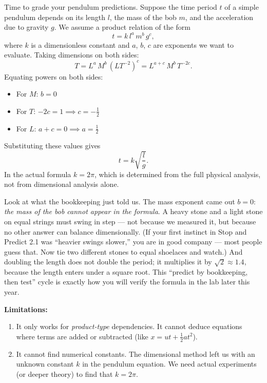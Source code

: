 Time to grade your pendulum predictions. Suppose the time period $t$ of a simple pendulum
depends on its length $l$, the mass of the bob $m$, and the acceleration due to gravity $g$.
We assume a product relation of the form
\begin{equation}
  t = k\,l^a\,m^b\,g^c,
\end{equation}
where $k$ is a dimensionless constant and $a$, $b$, $c$ are exponents we want to evaluate.
Taking dimensions on both sides:
\[
  T = L^a\,M^b\,(LT^{-2})^c = L^{a+c}\,M^b\,T^{-2c}.
\]
Equating powers on both sides:
\begin{itemize}
  \item For $M$: $b=0$
  \item For $T$: $-2c=1 \implies c=-\tfrac{1}{2}$
  \item For $L$: $a+c=0 \implies a=\tfrac{1}{2}$
\end{itemize}
Substituting these values gives
\begin{equation}
  t = k\sqrt{\frac{l}{g}}.
\end{equation}
In the actual formula $k=2\pi$, which is determined from the full physical analysis, not from
dimensional analysis alone.

Look at what the bookkeeping just told us. The mass exponent came out
$b=0$: \emph{the mass of the bob cannot appear in the formula}. A heavy stone
and a light stone on equal strings must swing in step --- not because we
measured it, but because no other answer can balance dimensionally. (If your
first instinct in Stop and Predict 2.1 was ``heavier swings slower,'' you are
in good company --- most people guess that. Now tie two different stones to
equal shoelaces and watch.) And doubling the length does not double the
period; it multiplies it by $\sqrt{2}\approx 1.4$, because the length enters
under a square root. This ``predict by bookkeeping, then test'' cycle is
exactly how you will verify the formula in the lab later this year.

\textbf{Limitations:}
\begin{enumerate}
  \item It only works for \emph{product-type} dependencies. It cannot deduce equations where
        terms are added or subtracted (like $x = ut + \tfrac{1}{2}at^2$).
  \item It cannot find numerical constants. The dimensional method left us with an
        unknown constant $k$ in the pendulum equation. We need actual experiments (or deeper
        theory) to find that $k=2\pi$.
\end{enumerate}

